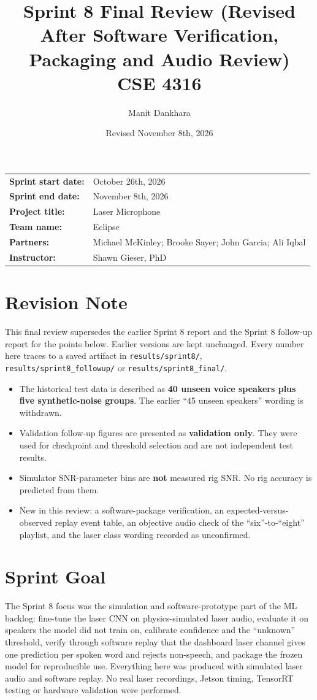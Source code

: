 \documentclass{article}
\title{Sprint 8 Final Review (Revised After Software Verification, Packaging and Audio Review) \\ CSE 4316}
\author{Manit Dankhara}
\date{Revised November 8th, 2026}
\begin{document}
\maketitle
\begin{center}
\begin{tabular}{l l}
\textbf{Sprint start date:} & October 26th, 2026 \\
\textbf{Sprint end date:} & November 8th, 2026 \\
\textbf{Project title:} & Laser Microphone \\
\textbf{Team name:} & Eclipse \\
\textbf{Partners:} & Michael McKinley; Brooke Sayer; John Garcia; Ali Iqbal \\
\textbf{Instructor:} & Shawn Gieser, PhD
\end{tabular}
\end{center}

\section{Revision Note}
This final review supersedes the earlier Sprint 8 report and the Sprint 8 follow-up report for the points below. Earlier versions are kept unchanged. Every number here traces to a saved artifact in \texttt{results/sprint8/}, \texttt{results/sprint8\_followup/} or \texttt{results/sprint8\_final/}.
\begin{itemize}[leftmargin=0.25in]
\item The historical test data is described as \textbf{40 unseen voice speakers plus five synthetic-noise groups}. The earlier ``45 unseen speakers'' wording is withdrawn.
\item Validation follow-up figures are presented as \textbf{validation only}. They were used for checkpoint and threshold selection and are not independent test results.
\item Simulator SNR-parameter bins are \textbf{not} measured rig SNR. No rig accuracy is predicted from them.
\item New in this review: a software-package verification, an expected-versus-observed replay event table, an objective audio check of the ``six''-to-``eight'' playlist, and the laser class wording recorded as unconfirmed.
\end{itemize}

\section{Sprint Goal}
The Sprint 8 focus was the simulation and software-prototype part of the ML backlog: fine-tune the laser CNN on physics-simulated laser audio, evaluate it on speakers the model did not train on, calibrate confidence and the ``unknown'' threshold, verify through software replay that the dashboard laser channel gives one prediction per spoken word and rejects non-speech, and package the frozen model for reproducible use. Everything here was produced with simulated laser audio and software replay. No real laser recordings, Jetson timing, TensorRT testing or hardware validation were performed.
\end{document}
